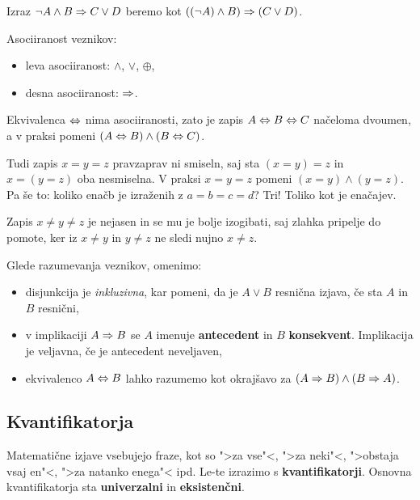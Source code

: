 \begin{zgled}
  Izraz $\neg A \land B \Rightarrow C \lor D$ beremo kot $((\neg  A) \land B) \Rightarrow (C \lor D)$.
\end{zgled}

Asociiranost veznikov:
%
\begin{itemize}
\item leva asociiranost: $\land$, $\lor$, $\oplus$,
\item desna asociiranost: $\Rightarrow$.
\end{itemize}
%
Ekvivalenca $\Leftrightarrow$ nima asociiranosti, zato je zapis $A \Leftrightarrow B \Leftrightarrow C$ načeloma dvoumen, a v praksi pomeni $(A \Leftrightarrow B) \land (B \Leftrightarrow C)$.

\begin{opomba}
  Tudi zapis $x = y = z$ pravzaprav ni smiseln, saj sta $(x = y) = z$ in $x = (y = z)$ oba nesmiselna. V praksi $x = y = z$ pomeni $(x = y) \land (y = z)$. Pa še to: koliko enačb je izraženih z $a = b = c = d$? Tri! Toliko kot je enačajev.
\end{opomba}

\begin{opomba}
  Zapis $x \neq y \neq z$ je nejasen in se mu je bolje izogibati, saj zlahka pripelje do pomote, ker iz $x
  \neq y$ in $y \neq z$ ne sledi nujno $x \neq z$.
\end{opomba}

Glede razumevanja veznikov, omenimo:
%
\begin{itemize}
\item disjunkcija je \emph{inkluzivna}, kar pomeni, da je $A \lor B$ resnična izjava, če sta $A$ in $B$ resnični,
\item v implikaciji $A \Rightarrow B$ se $A$ imenuje \textbf{antecedent} in $B$ \textbf{konsekvent}. Implikacija je veljavna, če je antecedent neveljaven,
\item ekvivalenco $A \Leftrightarrow B$ lahko razumemo kot okrajšavo za $(A \Rightarrow B) \land (B \Rightarrow A)$.
\end{itemize}

\subsection{Kvantifikatorja}

Matematične izjave vsebujejo fraze, kot so ">za vse"<, ">za neki"<, ">obstaja vsaj en"<, ">za natanko enega"< ipd. Le-te izrazimo s \textbf{kvantifikatorji}. Osnovna kvantifikatorja sta \textbf{univerzalni} in \textbf{eksistenčni}.


